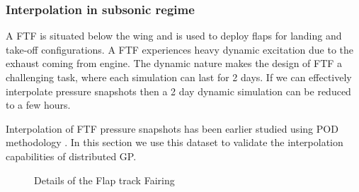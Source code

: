 \subsubsection{Interpolation in subsonic regime}\label{subSec:elsAResults}
A FTF is situated below the wing and is used to deploy flaps for landing and take-off configurations. A FTF experiences heavy dynamic excitation due to the exhaust coming from engine. The dynamic nature makes the design of FTF a challenging task, where each simulation can last for 2 days. If we can effectively interpolate pressure snapshots then a 2 day dynamic simulation can be reduced to a few hours. 

Interpolation of FTF pressure snapshots has been earlier studied using POD methodology  \cite{bosco2016nonlinear}. In this section we use this dataset to validate the interpolation capabilities of distributed GP. 


\begin{figure}[!ht]
  \centering
  \quad
  \quad
      \caption{Details of the Flap track Fairing}
\end{figure}


